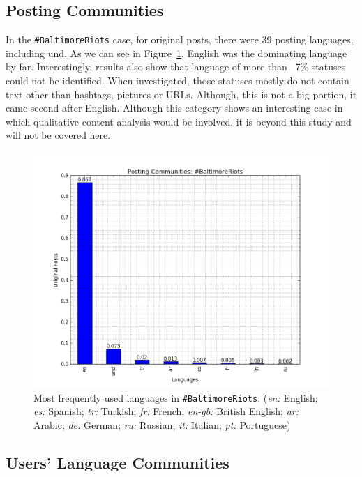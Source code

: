 \subsection{Posting Communities}

In the {\texttt{\#BaltimoreRiots}} case, for original posts, there were 39 posting
languages, including und. As we can see in Figure~\ref{fig:baltimore_langfreq}, English was the
dominating language by far. Interestingly, results also show that
language of more than ~7\% statuses could not be
identified. When investigated, those statuses mostly do not contain
text other than hashtags, pictures or URLs. Although, this is not a
big portion, it came second after English. Although this category
shows an interesting case in which qualitative content analysis would
be involved, it is beyond this study and will not be covered here.

\begin{figure}[htb]
\centering
\includegraphics[width=\columnwidth]{images/baltimore_langfreq.png}
\caption{Most frequently used languages in
  {\texttt{\#BaltimoreRiots}}: 
({\emph{en:}} English; {\emph{es:}} Spanish; {\emph{tr:}} Turkish;
  {\emph{fr:}} French; {\emph{en-gb:}} British English; {\emph{ar:}}
  Arabic; {\emph{de:}} German; {\emph{ru:}} Russian; {\emph{it:}}
  Italian; {\emph{pt:}} Portuguese)}
\label{fig:baltimore_langfreq}
\end{figure}

\subsection{Users' Language Communities}

